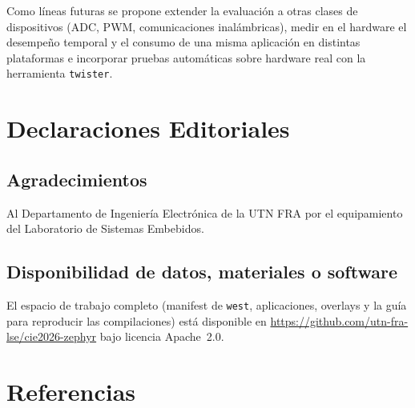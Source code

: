 Como líneas futuras se propone extender la evaluación a otras clases de dispositivos (ADC, PWM, comunicaciones inalámbricas), medir en el hardware el desempeño temporal y el consumo de una misma aplicación en distintas plataformas e incorporar pruebas automáticas sobre hardware real con la herramienta \texttt{twister}.

\section{Declaraciones Editoriales}
\subsection*{Agradecimientos}
Al Departamento de Ingeniería Electrónica de la UTN FRA por el equipamiento del Laboratorio de Sistemas Embebidos.

\subsection*{Disponibilidad de datos, materiales o software}
El espacio de trabajo completo (manifest de \texttt{west}, aplicaciones, overlays y la guía para reproducir las compilaciones) está disponible en \url{https://github.com/utn-fra-lse/cie2026-zephyr} bajo licencia Apache~2.0.

\section{Referencias}
\begingroup
\renewcommand{\section}[2]{}%


\endgroup

